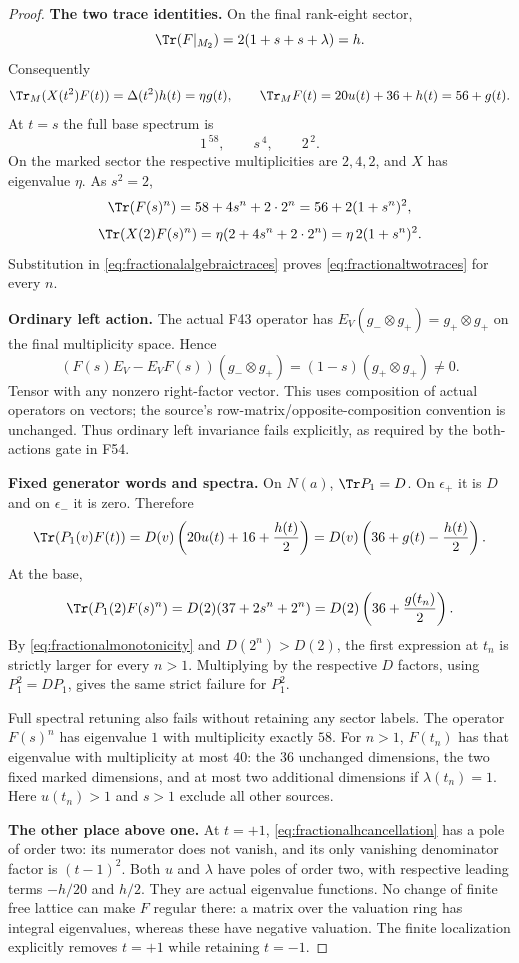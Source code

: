 \documentclass[11pt,a4paper]{article}
\newcommand{\fid}[1]{\textsf{#1}}\newcommand{\gate}[1]{\textsf{#1}}
\theoremstyle{named}\newtheorem{finding}{Finding}[section]
\theoremstyle{definition}\newtheorem{definition}[finding]{Definition}
\theoremstyle{remark}\newtheorem{remark}[finding]{Remark}
\begin{document}
\begin{proof}
\par\smallskip\noindent\textbf{The two trace identities.}\quad
On the final rank-eight sector,
\[
 \Tr(F|_{M_2})=2(1+s+s+\lambda)=h.
\]
Consequently
\begin{equation}\label{eq:fractionalalgebraictraces}
 \Tr_M(X(t^2)F(t))=\Delta(t^2)h(t)=\eta g(t),\qquad
 \Tr_M F(t)=20u(t)+36+h(t)=56+g(t).
\end{equation}
At $t=s$ the full base spectrum is
\[
 1^{\,58},\qquad s^{\,4},\qquad 2^{\,2}.
\]
On the marked sector the respective multiplicities
are $2,4,2$, and $X$ has eigenvalue $\eta$.
As $s^2=2$,
\[
 \Tr(F(s)^n)=58+4s^n+2\cdot2^n=56+2(1+s^n)^2,
\]
\[
 \Tr(X(2)F(s)^n)
       =\eta(2+4s^n+2\cdot2^n)=\eta\,2(1+s^n)^2.
\]
Substitution in \eqref{eq:fractionalalgebraictraces}
proves \eqref{eq:fractionaltwotraces} for every $n$.

\par\smallskip\noindent\textbf{Ordinary left action.}\quad
The actual \fid{F43} operator has
$E_V(g_-\otimes g_+)=g_+\otimes g_+$ on the final
multiplicity space. Hence
\[
 (F(s)E_V-E_VF(s))(g_-\otimes g_+)
       =(1-s)(g_+\otimes g_+)\ne0.
\]
Tensor with any nonzero right-factor vector.
This uses composition of actual operators on vectors;
the source's row-matrix/opposite-composition convention
is unchanged.
Thus ordinary left invariance fails explicitly, as
required by the both-actions gate in \fid{F54}.

\par\smallskip\noindent\textbf{Fixed generator words and spectra.}\quad
On $N(a)$, $\Tr P_1=D$.
On $\epsilon_+$ it is $D$ and on $\epsilon_-$ it is zero.
Therefore
\[
 \Tr(P_1(v)F(t))
 =D(v)\left(20u(t)+16+\frac{h(t)}2\right)
 =D(v)\left(36+g(t)-\frac{h(t)}2\right).
\]
At the base,
\[
 \Tr(P_1(2)F(s)^n)
  =D(2)(37+2s^n+2^n)
  =D(2)\left(36+\frac{g(t_n)}2\right).
\]
By \eqref{eq:fractionalmonotonicity} and
$D(2^n)>D(2)$, the first expression at $t_n$
is strictly larger for every $n>1$.
Multiplying by the respective $D$ factors, using
$P_1^2=DP_1$, gives the same strict failure for $P_1^2$.

Full spectral retuning also fails without retaining
any sector labels. The operator $F(s)^n$ has eigenvalue
$1$ with multiplicity exactly $58$.
For $n>1$, $F(t_n)$ has that eigenvalue with multiplicity
at most $40$: the $36$ unchanged dimensions, the two
fixed marked dimensions, and at most two additional
dimensions if $\lambda(t_n)=1$.
Here $u(t_n)>1$ and $s>1$ exclude all other sources.

\par\smallskip\noindent\textbf{The other place above one.}\quad
At $t=+1$, \eqref{eq:fractionalhcancellation} has a pole
of order two: its numerator does not vanish, and its
only vanishing denominator factor is $(t-1)^2$.
Both $u$ and $\lambda$ have poles of order two, with
respective leading terms $-h/20$ and $h/2$.
They are actual eigenvalue functions.
No change of finite free lattice can make $F$ regular
there: a matrix over the valuation ring has integral
eigenvalues, whereas these have negative valuation.
The finite localization explicitly removes $t=+1$
while retaining $t=-1$.
\end{proof}
\end{document}

